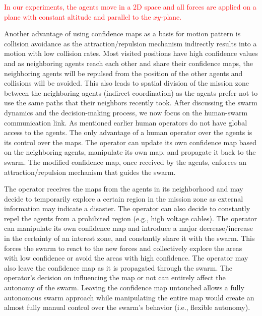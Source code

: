 \documentclass[runningheads]{llncs}%
\begin{document}
\textcolor{red}{In our experiments, the agents move in a 2D space and all forces are applied on a plane with constant altitude and parallel to the $xy$-plane.}

{Another advantage of using confidence maps as a basis for motion pattern is collision avoidance as the attraction/repulsion mechanism indirectly results into a motion with low collision rates. Most visited positions have high confidence values and as neighboring agents reach each other and share their confidence maps, the neighboring agents will be repulsed from the position of the other agents and collisions will be avoided. This also leads to spatial division of the mission zone between the neighboring agents (indirect coordination) as the agents prefer not to use the same paths that their neighbors recently took.} After discussing the swarm dynamics and the decision-making process, we now focus on the human-swarm communication link. As mentioned earlier human operators do not have global access to the agents. The only advantage of a human operator over the agents is its control over the maps. The operator can update its own confidence map based on the neighboring agents, manipulate its own map, and propagate it back to the swarm. The modified confidence map, once received by the agents, enforces an attraction/repulsion mechanism that guides the swarm. 

The operator receives the maps from the agents in its neighborhood and may decide to temporarily explore a certain region in the mission zone as external information may indicate a disaster. The operator can also decide to constantly repel the agents from a prohibited region (e.g., high voltage cables). The operator can manipulate its own confidence map and introduce a major decrease/increase in the certainty of an interest zone, and constantly share it with the swarm. This forces the swarm to react to the new forces and collectively explore the areas with low confidence or avoid the areas with high confidence. 
The operator may also leave the confidence map as it is propagated through the swarm. The operator's decision on influencing the map or not can entirely affect the autonomy of the swarm. Leaving the confidence map untouched allows a fully autonomous swarm approach while manipulating the entire map would create an almost fully manual control over the swarm's behavior (i.e., flexible autonomy). 
\end{document}
